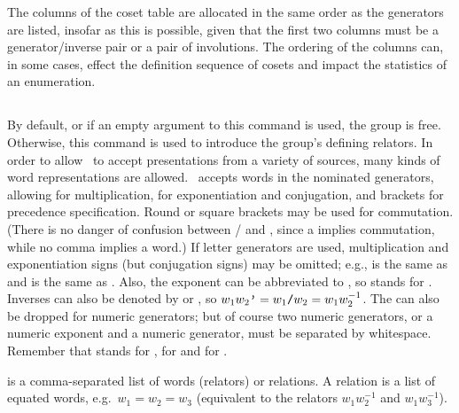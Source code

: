 The columns of the coset table are allocated in the same order as the 
  generators are listed, insofar as this is possible, given that the first
  two columns must be a generator/inverse pair or a pair of involutions.
The ordering of the columns can, in some cases, effect the definition
  sequence of cosets and impact the statistics of an enumeration.

\subsection{}
  \label{sec:grouprel}

By default, or if an empty argument to this command is used, the group
  is free.
Otherwise, this command is used to introduce the group's defining
  relators.
In order to allow \ace\ to accept presentations from a variety of
  sources, many kinds of word representations are allowed. 
\ace\ accepts words in the nominated generators, allowing \ttt{*} for
  multiplication, \ttt{\^{}} for exponentiation and conjugation, and
  brackets for precedence specification. 
Round or square brackets may be used for commutation. 
(There is no danger of confusion between \ttt{[a,b]}/ and
  , since a \ttt{,} implies commutation, while no comma implies a
  word.)
If letter generators are used, multiplication and exponentiation signs
  (but  conjugation signs) may be omitted; e.g.,  is the
  same as  and  is the same as .
Also, the exponent  can be abbreviated to \ttt{-},
  so  stands for .
Inverses can also be denoted by  or \ttt{/}, so
  $w_1w_2\texttt{'} = w_1\texttt{/}w_2 = w_1w^{-1}_2$\kern-1.5pt.
The \ttt{*} can also be dropped for numeric generators; but of course two
  numeric generators, or a numeric exponent and a numeric generator, must
  be separated by whitespace. 
Remember that  stands for ,  for
   and \ttt{[a,b]} \amp \ttt{[a,b,c]} for  \amp
  \ttt{[[a,b],c]}.

 is a comma-separated list of words (relators)
  or relations.
A relation is a list of equated words, e.g.~$w_1=w_2=w_3$ (equivalent to
  the relators $w_1w^{-1}_2$ and $w_1w^{-1}_3$).

\subsection{}

